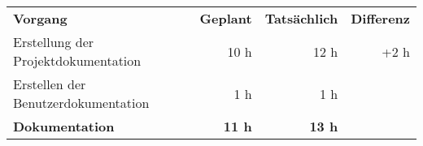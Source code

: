 \begin{tabular}{lrrr}
\rowcolor{heading}\textbf{Vorgang} & \textbf{Geplant} & \textbf{Tatsächlich} & \textbf{Differenz} \\
Erstellung der Projektdokumentation & 10 h   & 12 h  & +2 h \\
\rowcolor{odd}Erstellen der Benutzerdokumentation & 1 h   & 1 h   &  \\
\hline
\hline
\rowcolor{heading}\textbf{Dokumentation} & \textbf{11 h} & \textbf{13 h} & \textbf{} \\
\end{tabular}
